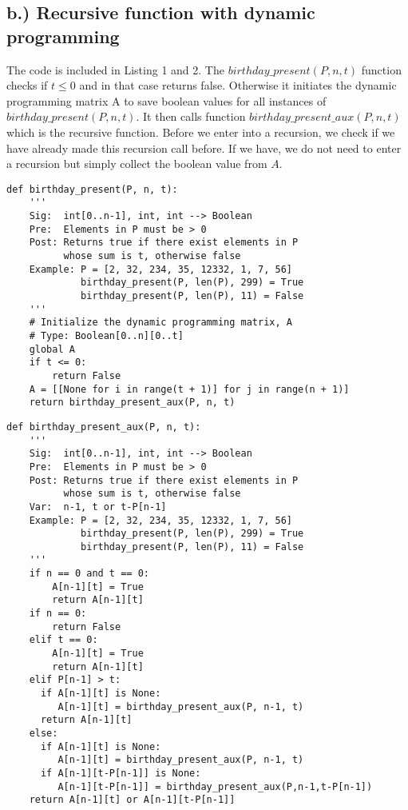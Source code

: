 \documentclass{article}
\begin{document}
\subsection*{b.) Recursive function with dynamic programming }
The code is included in Listing 1 and 2. The $birthday\_present(P,n,t)$ function checks if $t\leq 0$ and in that case returns false. Otherwise it initiates the dynamic programming matrix A to save boolean values for all instances of $birthday\_present(P,n,t)$. It then calls function $birthday\_present\_aux(P,n,t)$ which is the recursive function. Before we enter into a recursion, we check if we have already made this recursion call before. If we have, we do not need to enter a recursion but simply collect the boolean value from $A$.
\begin{lstlisting}[caption={Code for Birthday Present},captionpos=b]
def birthday_present(P, n, t):
    '''
    Sig:  int[0..n-1], int, int --> Boolean
    Pre:  Elements in P must be > 0
    Post: Returns true if there exist elements in P
          whose sum is t, otherwise false
    Example: P = [2, 32, 234, 35, 12332, 1, 7, 56]
             birthday_present(P, len(P), 299) = True
             birthday_present(P, len(P), 11) = False
    '''
    # Initialize the dynamic programming matrix, A
    # Type: Boolean[0..n][0..t]
    global A
    if t <= 0:
        return False
    A = [[None for i in range(t + 1)] for j in range(n + 1)]
    return birthday_present_aux(P, n, t)
\end{lstlisting}

\newpage
{}
\begin{lstlisting}[caption={Code for Birthday Present},captionpos=b]
def birthday_present_aux(P, n, t):
    '''
    Sig:  int[0..n-1], int, int --> Boolean
    Pre:  Elements in P must be > 0
    Post: Returns true if there exist elements in P
          whose sum is t, otherwise false
    Var:  n-1, t or t-P[n-1]
    Example: P = [2, 32, 234, 35, 12332, 1, 7, 56]
             birthday_present(P, len(P), 299) = True
             birthday_present(P, len(P), 11) = False
    '''
    if n == 0 and t == 0:
        A[n-1][t] = True
        return A[n-1][t]
    if n == 0:
        return False
    elif t == 0:
        A[n-1][t] = True
        return A[n-1][t]
    elif P[n-1] > t:
      if A[n-1][t] is None:
         A[n-1][t] = birthday_present_aux(P, n-1, t)
      return A[n-1][t]
    else:
      if A[n-1][t] is None:
         A[n-1][t] = birthday_present_aux(P, n-1, t)
      if A[n-1][t-P[n-1]] is None:
         A[n-1][t-P[n-1]] = birthday_present_aux(P,n-1,t-P[n-1])
    return A[n-1][t] or A[n-1][t-P[n-1]]
\end{lstlisting}
\end{document}
